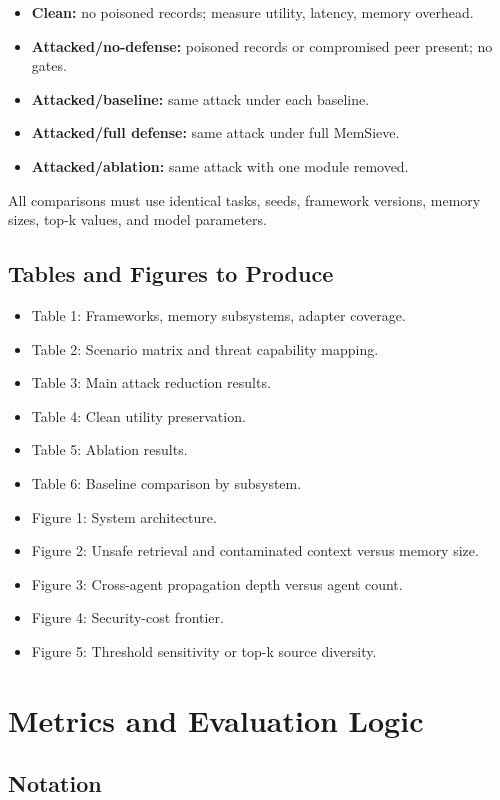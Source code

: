 \documentclass[11pt,oneside]{report}
\newcommand{\project}{MemSieve}
\begin{document}
\begin{itemize}
  \item \textbf{Clean:} no poisoned records; measure utility, latency, memory overhead.
  \item \textbf{Attacked/no-defense:} poisoned records or compromised peer present; no gates.
  \item \textbf{Attacked/baseline:} same attack under each baseline.
  \item \textbf{Attacked/full defense:} same attack under full \project{}.
  \item \textbf{Attacked/ablation:} same attack with one module removed.
\end{itemize}

All comparisons must use identical tasks, seeds, framework versions, memory sizes, top-k values, and
model parameters.

\section{Tables and Figures to Produce}

\begin{itemize}
  \item Table 1: Frameworks, memory subsystems, adapter coverage.
  \item Table 2: Scenario matrix and threat capability mapping.
  \item Table 3: Main attack reduction results.
  \item Table 4: Clean utility preservation.
  \item Table 5: Ablation results.
  \item Table 6: Baseline comparison by subsystem.
  \item Figure 1: System architecture.
  \item Figure 2: Unsafe retrieval and contaminated context versus memory size.
  \item Figure 3: Cross-agent propagation depth versus agent count.
  \item Figure 4: Security-cost frontier.
  \item Figure 5: Threshold sensitivity or top-k source diversity.
\end{itemize}

\chapter{Metrics and Evaluation Logic}

\section{Notation}
\end{document}
